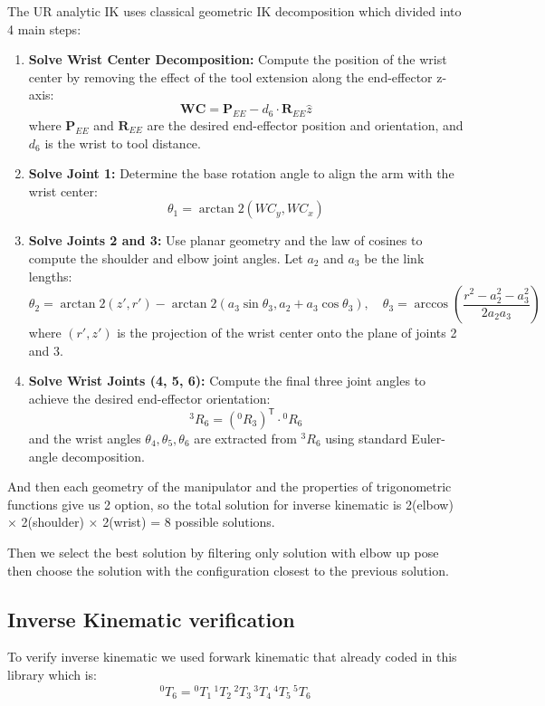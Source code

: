 The UR analytic IK uses classical geometric IK decomposition which divided into 4 main steps:
\begin{enumerate}
    \item \textbf{Solve Wrist Center Decomposition:} Compute the position of the wrist center by removing the effect of the tool extension along the end-effector z-axis:
    \[
    \mathbf{WC} = \mathbf{P}_{EE} - d_6 \cdot \mathbf{R}_{EE} \hat{z}
    \]
    where $\mathbf{P}_{EE}$ and $\mathbf{R}_{EE}$ are the desired end-effector position and orientation, and $d_6$ is the wrist to tool distance.
    \item \textbf{Solve Joint 1:} Determine the base rotation angle to align the arm with the wrist center:
    \[
    \theta_1 = \arctan2(WC_y, WC_x)
    \]
    \item \textbf{Solve Joints 2 and 3:} Use planar geometry and the law of cosines to compute the shoulder and elbow joint angles. Let $a_2$ and $a_3$ be the link lengths:
    \[
    \theta_2 = \arctan2(z', r') - \arctan2(a_3 \sin\theta_3, a_2 + a_3 \cos\theta_3), \quad
    \theta_3 = \arccos\left(\frac{r^2 - a_2^2 - a_3^2}{2 a_2 a_3}\right)
    \]
    where $(r', z')$ is the projection of the wrist center onto the plane of joints 2 and 3.

    \item \textbf{Solve Wrist Joints (4, 5, 6):} Compute the final three joint angles to achieve the desired end-effector orientation:
    \[
    {}^3R_6 = ({}^0R_3)^\mathsf{T} \cdot {}^0R_6
    \]
    and the wrist angles $\theta_4, \theta_5, \theta_6$ are extracted from ${}^3R_6$ using standard Euler-angle decomposition.
\end{enumerate}

And then each geometry of the manipulator and the properties of trigonometric functions give us 2 option, so the total solution for inverse kinematic is 2(elbow) × 2(shoulder) × 2(wrist) = 8 possible solutions.\vspace{0.5cm}

Then we select the best solution by filtering only solution with elbow up pose then choose the solution with the configuration closest to the previous solution.

\subsection{Inverse Kinematic verification}
To verify inverse kinematic we used forwark kinematic that already coded in this library which is:
\[
{}^{0}\!T_{6}
=
{}^{0}\!T_{1}
\,{}^{1}\!T_{2}
\,{}^{2}\!T_{3}
\,{}^{3}\!T_{4}
\,{}^{4}\!T_{5}
\,{}^{5}\!T_{6}
\]

